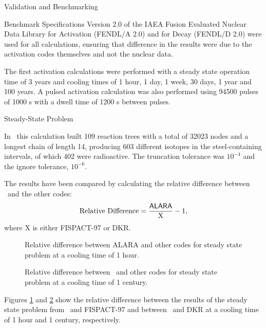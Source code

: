 \begin{chapter}{Validation and Benchmarking}
\begin{section}{Benchmark Specifications}
    Version 2.0 of the IAEA Fusion Evaluated Nuclear Data Library for
    Activation (FENDL/A 2.0) and for Decay (FENDL/D 2.0) were used for
    all calculations, ensuring that difference in the results were due
    to the activation codes themselves and not the nuclear data.
    
    The first activation calculations were performed with a steady
    state operation time of 3 years and cooling times of 1 hour, 1
    day, 1 week, 30 days, 1 year and 100 years.  A pulsed activation
    calculation was also performed using 94500 pulses of 1000 s with a
    dwell time of 1200 s between pulses.
  \end{section}
  
  \begin{section}{Steady-State Problem}
    
    In \ALARA\, this calculation built 109 reaction trees with a total
    of 32023 nodes and a longest chain of length 14, producing 603
    different isotopes in the steel-containing intervals, of which 402
    were radioactive.  The truncation tolerance was $10^{-4}$ and the
    ignore tolerance, $10^{-6}$.
    
    The results have been compared by calculating the relative
    difference between \ALARA\ and the other codes:
    $$\mbox{Relative Difference} = \frac{\mbox{\textsf{ALARA}}}{\mbox{X}} - 1,$$
    where X is either FISPACT-97 or DKR.  
    
    \begin{figure}[htbp]
      \begin{center}
        \caption{Relative difference between ALARA and other codes for
          steady state problem at a cooling time of 1 hour.}
        \label{fig:rel.diff.ss.1}
      \end{center}
    \end{figure}
    
    \begin{figure}[htbp]
      \begin{center}
        \caption{Relative difference between \ALARA\  and other codes for
          steady state problem at a cooling time of 1 century.}
        \label{fig:rel.diff.ss.2}
      \end{center}
    \end{figure}
    
    Figures \ref{fig:rel.diff.ss.1} and \ref{fig:rel.diff.ss.2} show
    the relative difference between the results of the steady state
    problem from \ALARA\ and FISPACT-97 and between \ALARA\ and DKR at
    a cooling time of 1 hour and 1 century, respectively.
    

\end{section}
\end{chapter}
